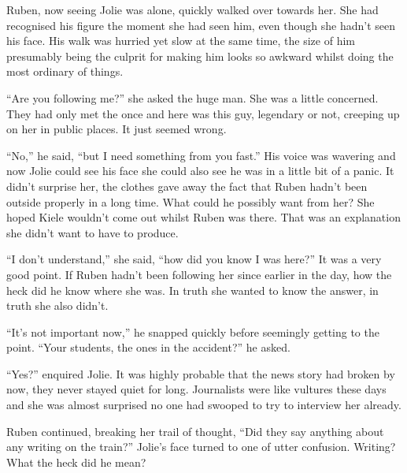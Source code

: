 Ruben, now seeing Jolie was alone, quickly walked over towards her.  She had recognised his figure the moment she had seen him, even though she hadn't seen his face.  His walk was hurried yet slow at the same time, the size of him presumably being the culprit for making him looks so awkward whilst doing the most ordinary of things.

``Are you following me?'' she asked the huge man.  She was a little concerned.  They had only met the once and here was this guy, legendary or not, creeping up on her in public places.  It just seemed wrong.

``No,'' he said, ``but I need something from you fast.''  His voice was wavering and now Jolie could see his face she could also see he was in a little bit of a panic.  It didn't surprise her, the clothes gave away the fact that Ruben hadn't been outside properly in a long time.  What could he possibly want from her?  She hoped Kiele wouldn't come out whilst Ruben was there.  That was an explanation she didn't want to have to produce.

``I don't understand,'' she said, ``how did you know I was here?''  It was a very good point.  If Ruben hadn't been following her since earlier in the day, how the heck did he know where she was.  In truth she wanted to know the answer, in truth she also didn't.

``It's not important now,'' he snapped quickly before seemingly getting to the point.  ``Your students, the ones in the accident?'' he asked.  

``Yes?'' enquired Jolie.  It was highly probable that the news story had broken by now, they never stayed quiet for long.  Journalists were like vultures these days and she was almost surprised no one had swooped to try to interview her already.  

Ruben continued, breaking her trail of thought, ``Did they say anything about any writing on the train?''  Jolie's face turned to one of utter confusion.  Writing?  What the heck did he mean?





